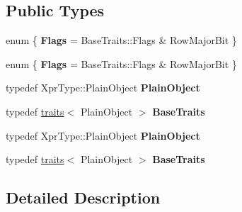 \subsection*{Public Types}
\begin{DoxyCompactItemize}
\item 
\mbox{\label{struct_eigen_1_1internal_1_1traits_3_01_inverse_3_01_xpr_type_01_4_01_4_abe60355ef2cbd2b44b427e557f96ac24}} 
enum \{ {\bfseries Flags} = Base\+Traits\+:\+:Flags \& Row\+Major\+Bit
 \}
\item 
\mbox{\label{struct_eigen_1_1internal_1_1traits_3_01_inverse_3_01_xpr_type_01_4_01_4_a5800278f5acbe3ddcd40df2b86eecb83}} 
enum \{ {\bfseries Flags} = Base\+Traits\+:\+:Flags \& Row\+Major\+Bit
 \}
\item 
\mbox{\label{struct_eigen_1_1internal_1_1traits_3_01_inverse_3_01_xpr_type_01_4_01_4_a22fef0ddc69b1cfcd4eab507ec9101f9}} 
typedef Xpr\+Type\+::\+Plain\+Object {\bfseries Plain\+Object}
\item 
\mbox{\label{struct_eigen_1_1internal_1_1traits_3_01_inverse_3_01_xpr_type_01_4_01_4_a48deb526f9cf30c706ae8d9d478ced38}} 
typedef \hyperlink{struct_eigen_1_1internal_1_1traits}{traits}$<$ Plain\+Object $>$ {\bfseries Base\+Traits}
\item 
\mbox{\label{struct_eigen_1_1internal_1_1traits_3_01_inverse_3_01_xpr_type_01_4_01_4_a22fef0ddc69b1cfcd4eab507ec9101f9}} 
typedef Xpr\+Type\+::\+Plain\+Object {\bfseries Plain\+Object}
\item 
\mbox{\label{struct_eigen_1_1internal_1_1traits_3_01_inverse_3_01_xpr_type_01_4_01_4_a48deb526f9cf30c706ae8d9d478ced38}} 
typedef \hyperlink{struct_eigen_1_1internal_1_1traits}{traits}$<$ Plain\+Object $>$ {\bfseries Base\+Traits}
\end{DoxyCompactItemize}


\subsection{Detailed Description}
